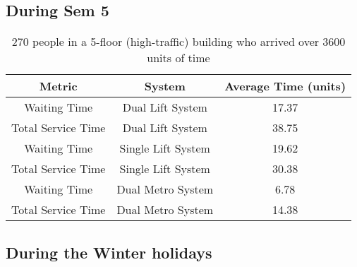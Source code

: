 \documentclass[12pt,a4paper]{report}
\begin{document}
\subsection{During Sem 5}
\begin{table}[H]
    \centering
    \begin{tabular}{|c|c|c|}
        \hline
        Metric               & System                & Average Time (units) \\ \hline
        Waiting Time         & Dual Lift System      & 17.37                \\ \hline
        Total Service Time   & Dual Lift System      & 38.75                \\ \hline
        Waiting Time         & Single Lift System    & 19.62                \\ \hline
        Total Service Time   & Single Lift System    & 30.38                \\ \hline
        Waiting Time         & Dual Metro System     & 6.78                 \\ \hline
        Total Service Time   & Dual Metro System     & 14.38                \\ \hline
    \end{tabular}
    \caption{270 people in a 5-floor (high-traffic) building who arrived over 3600 units of time}
    \label{tab:lift_data 1}
\end{table}

\subsection{During the Winter holidays}
\end{document}
